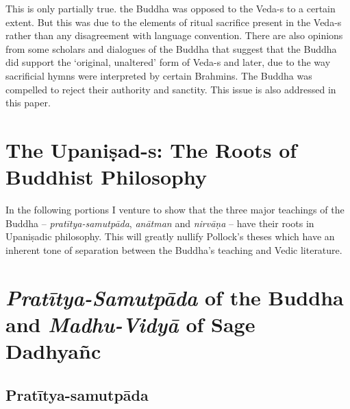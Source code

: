 This is only partially true. the Buddha was opposed to the Veda-s to a certain extent. But this was due to the elements of ritual sacrifice present in the Veda-s rather than any disagreement with language convention. There are also opinions from some scholars and dialogues of the Buddha that suggest that the Buddha did support the ‘original, unaltered’ form of Veda-s and later, due to the way sacrificial hymns were interpreted by certain Brahmins. The Buddha was compelled to reject their authority and sanctity. This issue is also addressed in this paper.


\section*{The Upaniṣad-s: \hfill\break The Roots of Buddhist Philosophy}

In the following portions I venture to show that the three major teachings of the Buddha – \textit{pratītya-samutpāda}, \textit{anātman} and \textit{nirvāṇa} – have their roots in Upaniṣadic philosophy. This will greatly nullify Pollock’s theses which have an inherent tone of separation between the Buddha’s teaching and Vedic literature.

\vspace{-.3cm}

\section*{\textit{Pratītya-Samutpāda} of the Buddha \hfil\break and \textit{Madhu-Vidyā} of Sage Dadhyañc}

\subsection*{Pratītya-samutpāda}

